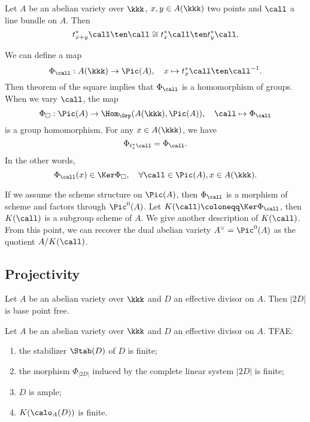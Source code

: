     \begin{theorem}\label{thm: theorem of the square}
        Let \(A\) be an abelian variety over \(\kkk\), \(x,y \in A(\kkk)\) two points and \(\call\) a line bundle on \(A\).
        Then 
        \[ t_{x+y}^*\call \ten \call \cong t_x^*\call \ten t_y^*\call. \]
    \end{theorem}

    \begin{remark}\label{rmk: theorem of the square and homomorphism to Picard group}
        We can define a map
        \[ \Phi_\call: A(\kkk) \to \Pic(A), \quad x \mapsto t_x^*\call \ten \call^{-1}. \]
        Then theorem of the square implies that \(\Phi_\call\) is a homomorphism of groups.
        When we vary \(\call\), the map 
        \[ \Phi_{\square}: \Pic(A) \to \Hom_{\Grp}(A(\kkk), \Pic(A)), \quad \call \mapsto \Phi_\call \]
        is a group homomorphism.
        For any \(x \in A(\kkk)\), we have
        \[ \Phi_{t_x^*\call} = \Phi_\call. \]
        In the other words, 
        \[ \Phi_\call(x) \in \Ker \Phi_{\square}, \quad \forall \call \in \Pic(A), x \in A(\kkk). \]
    \end{remark}

    If we assume the scheme structure on \(\Pic(A)\), then \(\Phi_\call\) is a morphism of scheme and factors through \(\Pic^0(A)\).
    Let \(K(\call) \coloneqq \Ker \Phi_\call\), then \(K(\call)\) is a subgroup scheme of \(A\).
    We give another description of \(K(\call)\).
    From this point, we can recover the dual abelian variety \(A^\vee = \Pic^0(A)\) as the quotient \(A/K(\call)\).


    


\subsection{Projectivity}

    \begin{proposition}\label{prop:2D_is_base_point_free}
        Let \(A\) be an abelian variety over \(\kkk\) and \(D\) an effective divisor on \(A\).
        Then \(|2D|\) is base point free.
    \end{proposition}

    \begin{theorem}\label{thm:ample_criteria_for_abelian_varieties}
        Let \(A\) be an abelian variety over \(\kkk\) and \(D\) an effective divisor on \(A\).
        TFAE:
        \begin{enumerate}
            \item the stabilizer \(\Stab(D)\) of \(D\) is finite;
            \item the morphism \(\Phi_{|2D|}\) induced by the complete linear system \(|2D|\) is finite;
            \item \(D\) is ample;
            \item \(K(\calo_A(D))\) is finite.
        \end{enumerate}
    \end{theorem}

